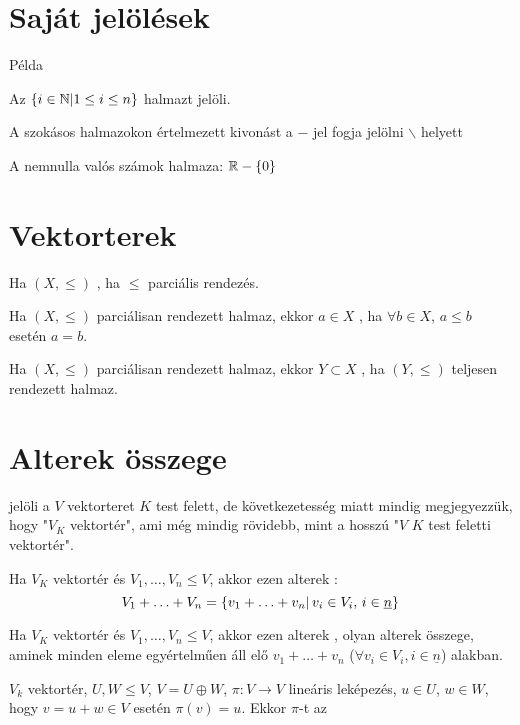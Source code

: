 \section{Saját jelölések}
\begin{pl}
	Példa
\end{pl}
\begin{jel}
	Az $\{i\in\mathbb{N}|1\leq i\leq n\}$ halmazt  jelöli.
\end{jel}
\begin{jel}
	A szokásos halmazokon értelmezett kivonást a $-$ jel fogja jelölni
	$\backslash$ helyett
\end{jel}
\begin{pl}
	A nemnulla valós számok halmaza: $\mathbb{R}-\{0\}$
\end{pl}

\section{Vektorterek}
\begin{ff}
	Ha $(X,\leq)$ , ha $\leq$ parciális
	rendezés.
\end{ff}
\begin{ff}
	Ha $(X,\leq)$ parciálisan rendezett halmaz, ekkor $a\in X$
	, ha $\forall b\in X$, $a\leq b$ esetén $a=b$.
\end{ff}
\begin{ff}
	Ha $(X,\leq)$ parciálisan rendezett halmaz, ekkor $Y\subset X$ ,
	ha $(Y,\leq)$ teljesen rendezett halmaz.
\end{ff}

\section{Alterek összege}
\begin{jel}
	 jelöli a $V$ vektorteret $K$ test felett, de következetesség miatt
	mindig megjegyezzük, hogy "$V_K$ vektortér", ami még mindig rövidebb,
	mint a hosszú "$V$ $K$ test feletti vektortér".
\end{jel}

\begin{ff}
	Ha $V_K$ vektortér és $V_1,\ldots,V_n\leq V$, akkor ezen alterek
	:
	\begin{equation*}
		V_1+\ldots+V_n=\{v_1+\ldots +v_n|\,v_i\in V_i,\,i\in\underline{n}\}
	\end{equation*}
\end{ff}
\begin{ff}
	Ha $V_K$ vektortér és $V_1,\ldots,V_n\leq V$, akkor ezen alterek
	, olyan alterek összege, aminek minden eleme
	egyértelműen áll elő $v_1+\ldots+v_n$ ($\forall v_i\in
	V_i, i\in\underline{n}$) alakban.
\end{ff}
\begin{ff}
	$V_k$ vektortér, $U,W\leq V$, $V=U\oplus W$, $\pi :V\to V$ lineáris
	leképezés, $u\in U$, $w\in W$, hogy $v=u+w \in V$ esetén $\pi(v)=u$.
	Ekkor $\pi$-t az 
\end{ff}

